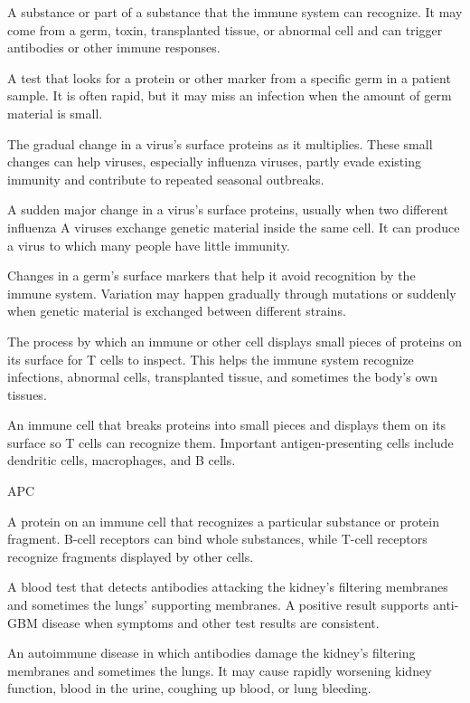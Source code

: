  A substance or part of a substance that the immune system can recognize. It may come from a germ, toxin, transplanted tissue, or abnormal cell and can trigger antibodies or other immune responses.

 A test that looks for a protein or other marker from a specific germ in a patient sample. It is often rapid, but it may miss an infection when the amount of germ material is small.

 The gradual change in a virus’s surface proteins as it multiplies. These small changes can help viruses, especially influenza viruses, partly evade existing immunity and contribute to repeated seasonal outbreaks.

 A sudden major change in a virus’s surface proteins, usually when two different influenza A viruses exchange genetic material inside the same cell. It can produce a virus to which many people have little immunity.

 Changes in a germ’s surface markers that help it avoid recognition by the immune system. Variation may happen gradually through mutations or suddenly when genetic material is exchanged between different strains.

 The process by which an immune or other cell displays small pieces of proteins on its surface for T cells to inspect. This helps the immune system recognize infections, abnormal cells, transplanted tissue, and sometimes the body’s own tissues.

 An immune cell that breaks proteins into small pieces and displays them on its surface so T cells can recognize them. Important antigen-presenting cells include dendritic cells, macrophages, and B cells.

\synonyms
APC

 A protein on an immune cell that recognizes a particular substance or protein fragment. B-cell receptors can bind whole substances, while T-cell receptors recognize fragments displayed by other cells.

 A blood test that detects antibodies attacking the kidney’s filtering membranes and sometimes the lungs’ supporting membranes. A positive result supports anti-GBM disease when symptoms and other test results are consistent.

 An autoimmune disease in which antibodies damage the kidney’s filtering membranes and sometimes the lungs. It may cause rapidly worsening kidney function, blood in the urine, coughing up blood, or lung bleeding.

